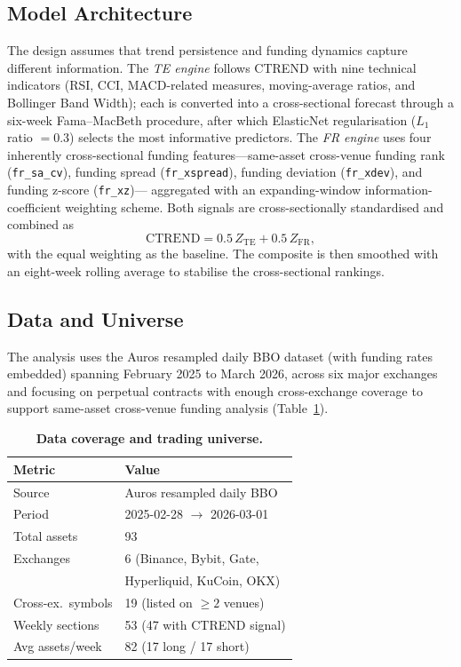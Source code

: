 \documentclass[10pt,twocolumn,a4paper]{article}
\begin{document}
\subsection{Model Architecture}

The design assumes that trend persistence and funding dynamics capture
different information.  The \emph{TE engine} follows CTREND with nine
technical indicators (RSI, CCI, MACD-related measures, moving-average
ratios, and Bollinger Band Width); each is converted into a
cross-sectional forecast through a six-week Fama--MacBeth procedure, after
which ElasticNet regularisation ($L_1$ ratio $=0.3$) selects the most
informative predictors.  The \emph{FR engine} uses four inherently
cross-sectional funding features---same-asset cross-venue funding rank
(\texttt{fr\_sa\_cv}), funding spread (\texttt{fr\_xspread}), funding
deviation (\texttt{fr\_xdev}), and funding z-score (\texttt{fr\_xz})---
aggregated with an expanding-window information-coefficient weighting
scheme.  Both signals are cross-sectionally standardised and combined as
\begin{equation}
  \text{CTREND} = 0.5\,Z_{\mathrm{TE}} + 0.5\,Z_{\mathrm{FR}},
  \label{eq:ctrend}
\end{equation}
with the equal weighting as the baseline.  The composite is then smoothed
with an eight-week rolling average to stabilise the cross-sectional
rankings.

\subsection{Data and Universe}

The analysis uses the Auros resampled daily BBO dataset (with funding rates
embedded) spanning February 2025 to March 2026, across six major exchanges
and focusing on perpetual contracts with enough cross-exchange coverage to
support same-asset cross-venue funding analysis
(Table~\ref{tab:fm-data}).

\begin{table}[H]
  \centering
  \caption{\textbf{Data coverage and trading universe.}}
  \label{tab:fm-data}
  \begin{tabular}{ll}
    \toprule
    \textbf{Metric} & \textbf{Value} \\
    \midrule
    Source            & Auros resampled daily BBO \\
    Period            & 2025-02-28 $\rightarrow$ 2026-03-01 \\
    Total assets      & 93 \\
    Exchanges         & 6 (Binance, Bybit, Gate, \\
                      & \quad Hyperliquid, KuCoin, OKX) \\
    Cross-ex.\ symbols& 19 (listed on $\ge 2$ venues) \\
    Weekly sections   & 53 (47 with CTREND signal) \\
    Avg assets/week   & 82 (17 long / 17 short) \\
    \bottomrule
  \end{tabular}
\end{table}
\end{document}
